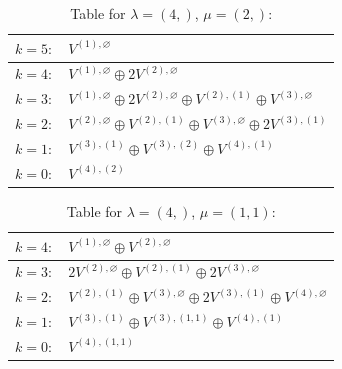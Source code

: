 \documentclass[a4paper,12pt]{article}
\begin{document}
\renewcommand{\arraystretch}{1.6} 
\begin{table}[H]
\centering
\caption{Table for $\lambda = (4,)$, $\mu = (2,)$:}
\begin{tabular}{|>{\centering\arraybackslash}p{15cm}|}
\hline
 $k = 5: \quad V^{(1), \varnothing} $ \\ \hline
 $k = 4: \quad V^{(1), \varnothing} \oplus 2 V^{(2), \varnothing} $ \\ \hline
 $k = 3: \quad V^{(1), \varnothing} \oplus 2 V^{(2), \varnothing} \oplus V^{(2), (1)} \oplus V^{(3), \varnothing} $ \\ \hline
 $k = 2: \quad V^{(2), \varnothing} \oplus V^{(2), (1)} \oplus V^{(3), \varnothing} \oplus 2 V^{(3), (1)} $ \\ \hline
 $k = 1: \quad V^{(3), (1)} \oplus V^{(3), (2)} \oplus V^{(4), (1)} $ \\ \hline
 $k = 0: \quad V^{(4), (2)} $ \\ \hline
\end{tabular}
\end{table}

\renewcommand{\arraystretch}{1.6} 
\begin{table}[H]
\centering
\caption{Table for $\lambda = (4,)$, $\mu = (1, 1)$:}
\begin{tabular}{|>{\centering\arraybackslash}p{15cm}|}
\hline
 $k = 4: \quad V^{(1), \varnothing} \oplus V^{(2), \varnothing} $ \\ \hline
 $k = 3: \quad 2 V^{(2), \varnothing} \oplus V^{(2), (1)} \oplus 2 V^{(3), \varnothing} $ \\ \hline
 $k = 2: \quad V^{(2), (1)} \oplus V^{(3), \varnothing} \oplus 2 V^{(3), (1)} \oplus V^{(4), \varnothing} $ \\ \hline
 $k = 1: \quad V^{(3), (1)} \oplus V^{(3), (1, 1)} \oplus V^{(4), (1)} $ \\ \hline
 $k = 0: \quad V^{(4), (1, 1)} $ \\ \hline
\end{tabular}
\end{table}
\end{document}

